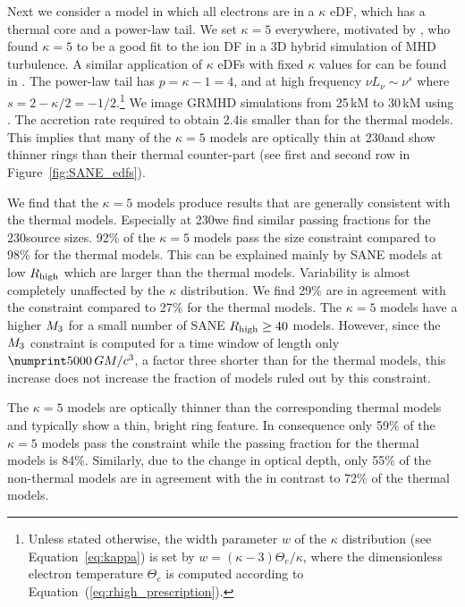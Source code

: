 Next we consider a model in which all electrons are in a $\kappa$ eDF, which has a thermal core and a power-law tail.
We set $\kappa = 5$ everywhere,  motivated by \citet{2016PhRvL.117w5101K}, who found $\kappa = 5$ to be a good fit to the ion DF in a 3D hybrid simulation of MHD turbulence.
A similar application of $\kappa$ eDFs with fixed $\kappa$ values for \sgra can be found in \citet{2018A&A...612A..34D}.
The power-law tail has $p = \kappa - 1 = 4$, and at high frequency $\nu L_\nu \sim \nu^s$ where $s = 2 - \kappa/2 = -1/2$.\footnote{Unless stated otherwise, the width parameter $w$ of the $\kappa$ distribution (see Equation~\ref{eq:kappa}) is set by $w = (\kappa - 3) \Theta_e/\kappa$, where the dimensionless electron temperature $\Theta_e$ is computed according to Equation~(\ref{eq:rhigh_prescription}).}
We image \bhac GRMHD simulations from 25\,kM to 30\,kM using \bhoss \citep{Younsi2012,Younsi2020}.
The accretion rate required to obtain 2.4\Jy is smaller than for the thermal models.
This implies that many of the $\kappa=5$ models are optically thin at 230\GHz and show thinner rings than their thermal counter-part (see first and second row in Figure~\ref{fig:SANE_edfs}).


We find that the $\kappa=5$ models produce results that are generally consistent with the \bhac thermal models.
Especially at 230\GHz we find similar passing fractions for the 230\GHz source sizes.
92\% of the $\kappa=5$ models pass the size constraint compared to 98\% for the thermal models.
This can be explained mainly by SANE models at low $R_\mathrm{high}$ which are larger than the thermal models.
Variability is almost completely unaffected by the $\kappa$ distribution.
We find 29\% are in agreement with the  constraint compared to 27\% for the thermal models.
The $\kappa=5$ models have a higher $M_{3}$ for a small number of SANE $R_\mathrm{high} \geq 40$ models.
However, since the $M_{3}$ constraint is computed for a time window of length only $\no{5000}\,\tg$, a factor three shorter than for the thermal models, this increase does not increase the fraction of models ruled out by this constraint.


The $\kappa=5$ models are optically thinner than the corresponding thermal models and typically show a thin, bright ring feature.
In consequence only 59\% of the $\kappa=5$ models pass the \vam constraint while the passing fraction for the thermal models is 84\%.
Similarly, due to the change in optical depth, only 55\% of the non-thermal models are in agreement with the \vam in contrast to 72\% of the thermal models.

